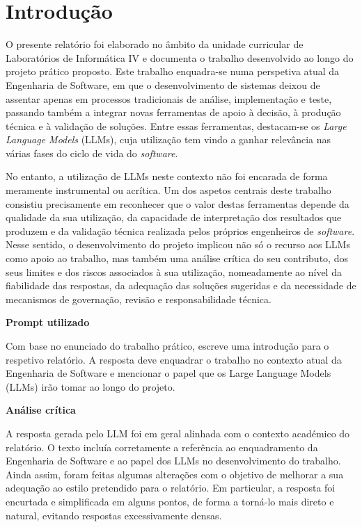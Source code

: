 
\chapter{Introdução}

    O presente relatório foi elaborado no âmbito da unidade curricular de Laboratórios de Informática IV e documenta o trabalho desenvolvido ao longo do projeto prático proposto. Este trabalho enquadra-se numa perspetiva atual da Engenharia de Software, em que o desenvolvimento de sistemas deixou de assentar apenas em processos tradicionais de análise, implementação e teste, passando também a integrar novas ferramentas de apoio à decisão, à produção técnica e à validação de soluções. Entre essas ferramentas, destacam-se os \textit{Large Language Models} (LLMs), cuja utilização tem vindo a ganhar relevância nas várias fases do ciclo de vida do \textit{software}.

    No entanto, a utilização de LLMs neste contexto não foi encarada de forma meramente instrumental ou acrítica. Um dos aspetos centrais deste trabalho consistiu precisamente em reconhecer que o valor destas ferramentas depende da qualidade da sua utilização, da capacidade de interpretação dos resultados que produzem e da validação técnica realizada pelos próprios engenheiros de \textit{software}. Nesse sentido, o desenvolvimento do projeto implicou não só o recurso aos LLMs como apoio ao trabalho, mas também uma análise crítica do seu contributo, dos seus limites e dos riscos associados à sua utilização, nomeadamente ao nível da fiabilidade das respostas, da adequação das soluções sugeridas e da necessidade de mecanismos de governação, revisão e responsabilidade técnica.

    \begin{tcolorbox}[title=Interação com o LLM]
    \textbf{Prompt utilizado}

    Com base no enunciado do trabalho prático, escreve uma introdução para o respetivo relatório. A resposta deve enquadrar o trabalho no contexto atual da Engenharia de Software e mencionar o papel que os Large Language Models (LLMs) irão tomar ao longo do projeto.

    \tcblower

    \textbf{Análise crítica}

    A resposta gerada pelo LLM foi em geral alinhada com o contexto académico do relatório. O texto incluía corretamente a referência ao enquadramento da Engenharia de Software e ao papel dos LLMs no desenvolvimento do trabalho. Ainda assim, foram feitas algumas alterações com o objetivo de melhorar a sua adequação ao estilo pretendido para o relatório. Em particular, a resposta foi encurtada e simplificada em alguns pontos, de forma a torná-lo mais direto e natural, evitando respostas excessivamente densas.
    \end{tcolorbox}

